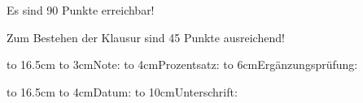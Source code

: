 \documentclass[12pt]{exam}
\begin{document}
\begin{coverpages}
Es sind 90 Punkte erreichbar!\par
Zum Bestehen der Klausur sind 45 Punkte ausreichend!

\begin{center}
\cellwidth{2.2em}
\gradetable[h]
\end{center}

\vspace{0.5cm}

\enlargethispage{2cm}

\hbox to 16.5cm {
  \hbox to 3cm{Note: \enspace \hrulefill}\hfill
  \hbox to 4cm{Prozentsatz: \enspace \hrulefill}\hfill
  \hbox to 6cm{Ergänzungsprüfung: \enspace \hrulefill}}

\vspace{0.8cm}
\hbox to 16.5cm {
  \hbox to 4cm{Datum: \enspace \hrulefill}\hfill
  \hbox to 10cm{Unterschrift: \enspace \hrulefill}}


\end{coverpages}
\end{document}
